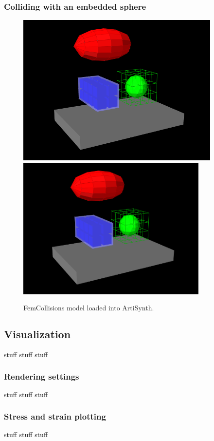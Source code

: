 
\subsubsection{Colliding with an embedded sphere}

\begin{figure}[h]
\begin{center}
\iflatexml
 \includegraphics[]{images/FemCollisions}
\else
 \includegraphics[width=3.75in]{images/FemCollisions}
\fi
\end{center}
\caption{FemCollisions model loaded into ArtiSynth.}
\label{FemCollisions:fig}
\end{figure}

\subsection{Visualization}

stuff stuff stuff

\subsubsection{Rendering settings}

stuff stuff stuff

\subsubsection{Stress and strain plotting}

stuff stuff stuff
